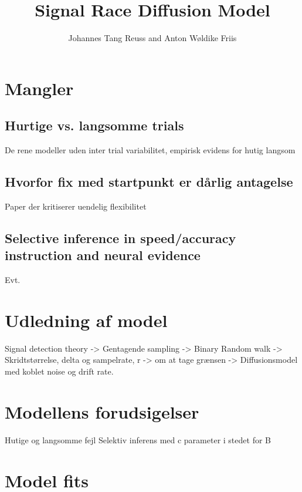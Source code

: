 \documentclass{article}
\title{Signal Race Diffusion Model}
\author{Johannes Tang Reuss and Anton Wøldike Friis}
\begin{document}
\maketitle

\section{Mangler}

\subsection*{Hurtige vs. langsomme trials}
De rene modeller uden inter trial variabilitet, empirisk evidens for hutig langsom

\subsection*{Hvorfor fix med startpunkt er dårlig antagelse}
Paper der kritiserer uendelig flexibilitet

\subsection*{Selective inference in speed/accuracy instruction and neural evidence}
Evt. 

\section*{Udledning af model}
Signal detection theory -> Gentagende sampling -> Binary Random walk -> Skridtstørrelse, delta og sampelrate, r -> om at tage
grænsen -> Diffusionsmodel med koblet noise og drift rate. 

\section*{Modellens forudsigelser}
Hutige og langsomme fejl
Selektiv inferens med c parameter i stedet for B

\section*{Model fits}
\end{document}
